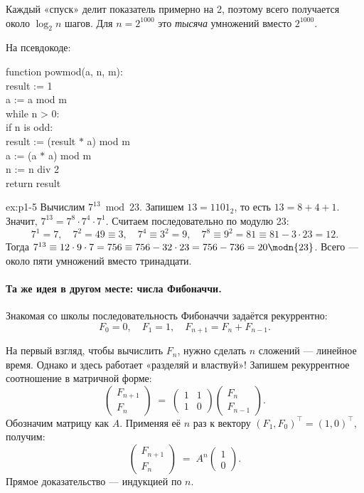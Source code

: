 \noindent
Каждый «спуск» делит показатель примерно на 2, поэтому всего получается около $\log_2 n$ шагов. Для $n = 2^{1000}$ это \emph{тысяча} умножений вместо $2^{1000}$.

На псевдокоде:
\begin{center}
\begin{minipage}{0.78\linewidth}
\ttfamily\small
\noindent
function powmod(a, n, m):\\
\quad result := 1\\
\quad a := a mod m\\
\quad while n > 0:\\
\qquad if n is odd:\\
\quad\qquad result := (result $\ast$ a) mod m\\
\qquad a := (a $\ast$ a) mod m\\
\qquad n := n div 2\\
\quad return result
\end{minipage}
\end{center}

\begin{example}{}{ex:p1-5}
Вычислим $7^{13} \bmod 23$. Запишем $13 = 1101_2$, то есть $13 = 8 + 4 + 1$. Значит, $7^{13} = 7^{8}\cdot 7^{4}\cdot 7^{1}$. Считаем последовательно по модулю 23:
\[
7^1 = 7,\quad 7^2 = 49 \equiv 3,\quad 7^4 \equiv 3^2 = 9,\quad 7^8 \equiv 9^2 = 81 \equiv 81 - 3\cdot 23 = 12.
\]
Тогда $7^{13} \equiv 12\cdot 9\cdot 7 = 756 \equiv 756 - 32\cdot 23 = 756 - 736 = 20 \modn{23}$. Всего --- около пяти умножений вместо тринадцати.
\end{example}

\paragraph*{Та же идея в другом месте: числа Фибоначчи.} Знакомая со школы последовательность Фибоначчи задаётся рекуррентно:
\[
F_0 = 0,\quad F_1 = 1,\quad F_{n+1} = F_n + F_{n-1}.
\]

На первый взгляд, чтобы вычислить $F_n$, нужно сделать $n$ сложений --- линейное время. Однако и здесь работает «разделяй и властвуй»! Запишем рекуррентное соотношение в матричной форме:
\[
\begin{pmatrix} F_{n+1} \\ F_n \end{pmatrix}
\;=\;
\begin{pmatrix} 1 & 1 \\ 1 & 0 \end{pmatrix}
\begin{pmatrix} F_n \\ F_{n-1} \end{pmatrix}.
\]
Обозначим матрицу как $A$. Применяя её $n$ раз к вектору $(F_1, F_0)^\top = (1,0)^\top$, получим:
\[
\begin{pmatrix} F_{n+1} \\ F_n \end{pmatrix}
\;=\;
A^n
\begin{pmatrix} 1 \\ 0 \end{pmatrix}.
\]
Прямое доказательство --- индукцией по $n$.

